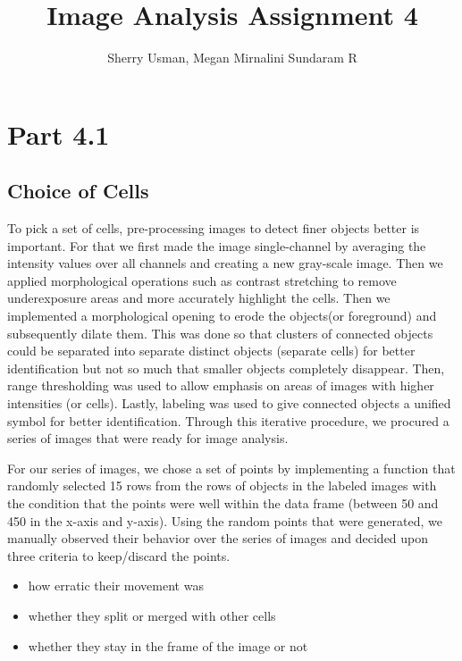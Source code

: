 \documentclass{article}
\title{Image Analysis Assignment 4}
\author{Sherry Usman, Megan Mirnalini Sundaram R}
\begin{document}
\maketitle

\section*{Part 4.1}
\subsection*{Choice of Cells}
\par To pick a set of cells, pre-processing images to detect finer objects better is important. For that we first made the image single-channel by averaging the intensity values over all channels and creating a new gray-scale image. Then we applied morphological operations such as contrast stretching to remove underexposure areas and more accurately highlight the cells. Then we implemented a morphological opening to erode the objects(or foreground) and subsequently dilate them. This was done so that clusters of connected objects could be separated into separate distinct objects (separate cells) for better identification but not so much that smaller objects completely disappear. Then, range thresholding was used to allow emphasis on areas of images with higher intensities (or cells). Lastly, labeling was used to give connected objects a unified symbol for better identification. Through this iterative procedure, we procured a series of images that were ready for image analysis.\newline 

\par For our series of images, we chose a set of points by implementing a function that randomly selected 15 rows from the rows of objects in the labeled images with the condition that the points were well within the data frame (between 50 and 450 in the x-axis and y-axis). Using the random points that were generated, we manually observed their behavior over the series of images and decided upon three criteria to keep/discard the points. 
\begin{itemize}
    \item how erratic their movement was
    \item whether they split or merged with other cells
    \item whether they stay in the frame of the image or not
\end{itemize}
\end{document}
